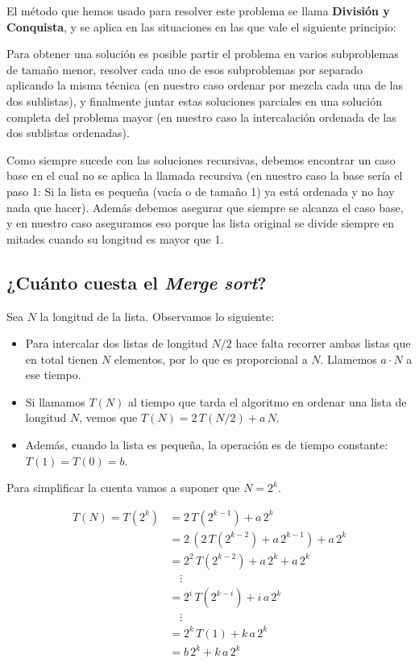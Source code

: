 \begin{sabias_que}
El método que hemos usado para resolver este problema se llama {\bf División y
Conquista}, y se aplica en las situaciones en las que vale el siguiente
principio:

Para obtener una solución es posible partir el problema en varios subproblemas
de tamaño menor, resolver cada uno de esos subproblemas por separado aplicando
la misma técnica (en nuestro caso ordenar por mezcla cada una de las dos
sublistas), y finalmente juntar estas soluciones parciales en una solución
completa del problema mayor (en nuestro caso la intercalación ordenada de las
dos sublistas ordenadas).

Como siempre sucede con las soluciones recursivas, debemos encontrar un caso
base en el cual no se aplica la llamada recursiva (en nuestro caso la base
sería el paso 1: Si la lista es pequeña (vacía o de tamaño 1) ya está ordenada
y no hay nada que hacer). Además debemos asegurar que siempre se alcanza el
caso base, y en nuestro caso aseguramos eso porque las lista original se divide
siempre en mitades cuando su longitud es mayor que 1.
\end{sabias_que}

\subsection{¿Cuánto cuesta el \emph{Merge sort}?}
Sea $N$ la longitud de la lista. Observamos lo siguiente:
\begin{itemize}

\item Para intercalar dos listas de longitud $N/2$ hace falta recorrer
ambas listas que en total tienen $N$ elementos, por lo que es proporcional
a $N$. Llamemos $a \cdot N$ a ese tiempo.

\item Si llamamos $T(N)$ al tiempo que tarda el algoritmo en ordenar
una lista de longitud $N$, vemos que $T(N) = 2 \, T(N/2) + a \, N$.

\item Además, cuando la lista es pequeña, la operación es de tiempo
constante: $T(1) = T(0) = b$.
\end{itemize}

Para simplificar la cuenta vamos a suponer que $N = 2^k$.

\begin{align*}
T(N) = T(2^k) &= 2 \, T(2^{k-1}) + a \, 2^k \\
              &= 2 \, \left( 2 \, T(2^{k-2} ) + a \, 2^{k-1} \right) + a \, 2^k\\
&= 2^2 \, T(2^{k-2} ) + a \, 2^k +a \, 2^k\\
&\quad\vdots\\
&= 2^i \, T(2^{k-i})+ i \, a \, 2^k\\
&\quad\vdots\\
&= 2^k \, T(1) + k \, a \, 2^k\\
&= b \, 2^k  + k \, a \, 2^k
\end{align*}

